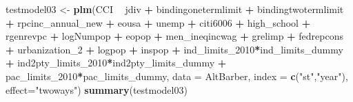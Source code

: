 \documentclass[]{article}
\newenvironment{Shaded}{\begin{snugshade}}{\end{snugshade}}
\newcommand{\KeywordTok}[1]{\textcolor[rgb]{0.13,0.29,0.53}{\textbf{#1}}}
\newcommand{\DataTypeTok}[1]{\textcolor[rgb]{0.13,0.29,0.53}{#1}}
\newcommand{\DecValTok}[1]{\textcolor[rgb]{0.00,0.00,0.81}{#1}}
\newcommand{\StringTok}[1]{\textcolor[rgb]{0.31,0.60,0.02}{#1}}
\newcommand{\OperatorTok}[1]{\textcolor[rgb]{0.81,0.36,0.00}{\textbf{#1}}}
\newcommand{\NormalTok}[1]{#1}
\begin{document}
\begin{Shaded}
\begin{Highlighting}[]
\NormalTok{testmodel03 <-}\StringTok{ }\KeywordTok{plm}\NormalTok{(CCI }\OperatorTok{~}\StringTok{ }\NormalTok{jdiv }\OperatorTok{+}\StringTok{ }\NormalTok{bindingonetermlimit }\OperatorTok{+}\StringTok{ }\NormalTok{bindingtwotermlimit }\OperatorTok{+}\StringTok{ }\NormalTok{rpcinc_annual_new }\OperatorTok{+}\StringTok{ }\NormalTok{eousa }\OperatorTok{+}\StringTok{ }\NormalTok{unemp }\OperatorTok{+}\StringTok{ }\NormalTok{citi6006 }\OperatorTok{+}\StringTok{ }\NormalTok{high_school }\OperatorTok{+}\StringTok{ }\NormalTok{rgenrevpc }\OperatorTok{+}\StringTok{ }\NormalTok{logNumpop }\OperatorTok{+}\StringTok{ }\NormalTok{eopop }\OperatorTok{+}\StringTok{ }\NormalTok{men_ineqincwag }\OperatorTok{+}\StringTok{ }\NormalTok{grelimp }\OperatorTok{+}\StringTok{ }\NormalTok{fedrepcons }\OperatorTok{+}\StringTok{ }\NormalTok{urbanization_}\DecValTok{2} \OperatorTok{+}\StringTok{ }\NormalTok{logpop }\OperatorTok{+}\StringTok{ }\NormalTok{inspop }\OperatorTok{+}\StringTok{ }\NormalTok{ind_limits_}\DecValTok{2010}\OperatorTok{*}\NormalTok{ind_limits_dummy }\OperatorTok{+}\StringTok{ }\NormalTok{ind2pty_limits_}\DecValTok{2010}\OperatorTok{*}\NormalTok{ind2pty_limits_dummy }\OperatorTok{+}\StringTok{ }\NormalTok{pac_limits_}\DecValTok{2010}\OperatorTok{*}\NormalTok{pac_limits_dummy, }\DataTypeTok{data =}\NormalTok{ AltBarber, }\DataTypeTok{index =} \KeywordTok{c}\NormalTok{(}\StringTok{"st"}\NormalTok{,}\StringTok{"year"}\NormalTok{), }\DataTypeTok{effect=}\StringTok{"twoways"}\NormalTok{)}
\KeywordTok{summary}\NormalTok{(testmodel03)}
\end{Highlighting}
\end{Shaded}
\end{document}
